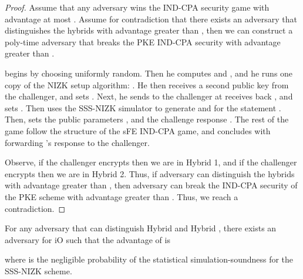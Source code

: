 \documentclass{llncs}
\begin{document}
\begin{proof}
Assume that any adversary wins the IND-CPA security game with advantage at most .
Assume for contradiction that there exists an adversary  that distinguishes the hybrids with advantage greater than , then we can construct a poly-time adversary  that breaks the PKE IND-CPA security with advantage greater than . 

 begins by choosing  uniformly random. Then he computes  and , and he runs one copy of the NIZK setup algorithm: . He then receives a second public key  from the challenger, and sets . Next, he sends  to the challenger at receives back , and sets . Then  uses the SSS-NIZK simulator to generate  and  for the statement . Then,  sets the public parameters , and the challenge response . 
The rest of the game follow the structure of the sFE IND-CPA game, and concludes with  forwarding 's response  to the challenger. 

Observe, if the challenger encrypts  then we are in Hybrid 1, and if the challenger encrypts  then we are in Hybrid 2. Thus, if adversary  can distinguish the hybrids with advantage greater than , then adversary  can break the IND-CPA security of the PKE scheme with advantage greater than . Thus, we reach a contradiction.
\end{proof}


\begin{claim} \label{claim:sFE_IND-CPA_iO_1}
For any adversary  that can distinguish Hybrid  and Hybrid , there exists an adversary  for iO such that the advantage of  is
	
	where  is the negligible probability of the statistical simulation-soundness for the SSS-NIZK scheme.
\end{claim}
\end{document}
